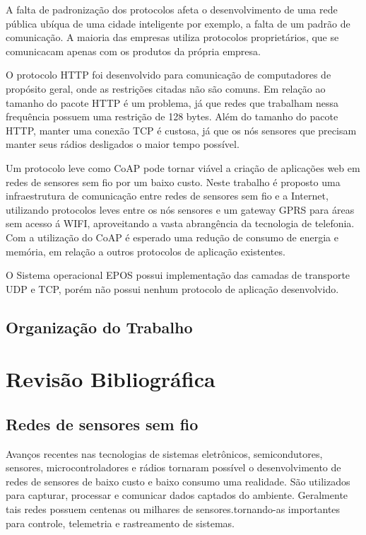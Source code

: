 A falta de padroniza\c{c}\~ao dos protocolos afeta o desenvolvimento de uma rede p\'ublica ub\'iqua de uma cidade inteligente por exemplo, a falta de um padr\~ao de comunica\c{c}\~ao. A maioria das empresas utiliza protocolos propriet\'arios, que se comunicacam apenas com os produtos da pr\'opria empresa.

O protocolo HTTP foi desenvolvido para comunica\c{c}\~ao de computadores de prop\'osito geral, onde as restri\c{c}\~oes citadas n\~ao s\~ao comuns. Em rela\c{c}\~ao ao tamanho do pacote HTTP \'e um problema, j\'a que redes que trabalham nessa frequência possuem uma restri\c{c}\~ao de 128 bytes.  Al\'em do tamanho do pacote HTTP, manter uma conex\~ao TCP \'e custosa, j\'a que os n\'os sensores que precisam manter seus r\'adios desligados o maior tempo poss\'ivel.

Um protocolo leve como CoAP pode tornar vi\'avel a cria\c{c}\~ao de aplica\c{c}\~oes web em redes de sensores sem fio por um baixo custo. Neste trabalho \'e proposto uma infraestrutura de comunica\c{c}\~ao entre redes de sensores sem fio e a Internet, utilizando protocolos leves entre os n\'os sensores e um gateway GPRS para \'areas sem acesso \'a WIFI, aproveitando a vasta abrangência da tecnologia de telefonia. Com a utiliza\c{c}\~ao do CoAP \'e esperado uma redu\c{c}\~ao de consumo de energia e mem\'oria, em rela\c{c}\~ao a outros protocolos de aplica\c{c}\~ao existentes.

O Sistema operacional EPOS possui implementa\c{c}\~ao das camadas de transporte UDP e TCP, por\'em n\~ao possui nenhum protocolo de aplica\c{c}\~ao desenvolvido.

\subsection{Organiza\c{c}\~ao do Trabalho}

\section{Revis\~ao Bibliogr\'afica}

\subsection{Redes de sensores sem fio}
Avan\c{c}os recentes nas tecnologias de sistemas eletrônicos, semicondutores, sensores, microcontroladores e r\'adios tornaram poss\'ivel o desenvolvimento de redes de sensores de baixo custo e baixo consumo uma realidade. S\~ao utilizados para capturar, processar e comunicar dados captados do ambiente. Geralmente tais redes possuem centenas ou milhares de sensores.tornando-as importantes para controle, telemetria e rastreamento de sistemas.

